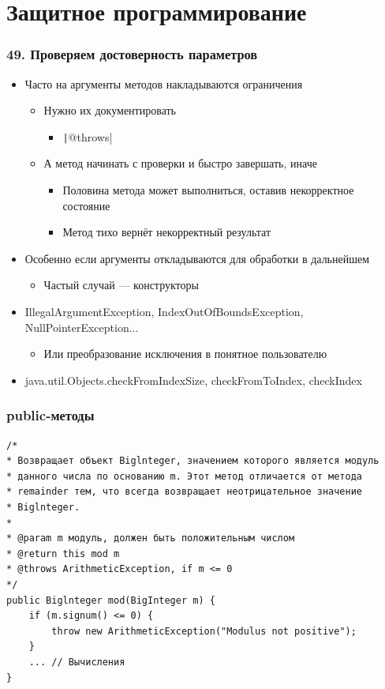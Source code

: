 \documentclass[xetex,mathserif,serif]{beamer}
\begin{document}
	\section{Защитное программирование}

	\begin{frame}
		\frametitle{49. Проверяем достоверность параметров}
		\begin{itemize}
			\item Часто на аргументы методов накладываются ограничения
			\begin{itemize}
				\item Нужно их документировать
				\begin{itemize}
					\item \texttt|@throws|
				\end{itemize}
				\item А метод начинать с проверки и быстро завершать, иначе
				\begin{itemize}
					\item Половина метода может выполниться, оставив некорректное состояние
					\item Метод тихо вернёт некорректный результат
				\end{itemize}
			\end{itemize}
			\item Особенно если аргументы откладываются для обработки в дальнейшем
			\begin{itemize}
				\item Частый случай --- конструкторы
			\end{itemize}
			\item IllegalArgumentException, IndexOutOfBoundsException, NullPointerException...
			\begin{itemize}
				\item Или преобразование исключения в понятное пользователю
			\end{itemize}
			\item java.util.Objects.checkFromIndexSize, checkFromToIndex​, checkIndex
		\end{itemize}
	\end{frame}

	\begin{frame}[fragile]
		\frametitle{public-методы}
		\begin{small}
			\begin{verbatim}
/*
* Возвращает объект Biglnteger, значением которого является модуль 
* данного числа по основанию m. Этот метод отличается от метода 
* remainder тем, что всегда возвращает неотрицательное значение 
* Biglnteger.
*
* @раrаm m модуль, должен быть положительным числом
* @return this mod m
* @throws ArithmeticException, if m <= 0
*/
public Biglnteger mod(BigInteger m) {
    if (m.signum() <= 0) {
        throw new ArithmeticException("Modulus not positive");
    }
    ... // Вычисления
}
			\end{verbatim}
		\end{small}
	\end{frame}
\end{document}
